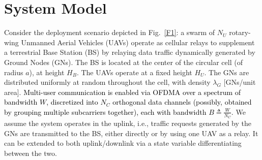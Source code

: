 \documentclass[10pt, twocolumn]{IEEEtran}
\theoremstyle{plain}
\theoremstyle{definition}
\theoremstyle{remark}
\newcommand\hlt[1]{\textcolor{black}{#1}}
\begin{document}
\section{System Model}\label{S2}
Consider the deployment scenario depicted in Fig.~\ref{F1}: a swarm of $N_{U}$ rotary-wing Unmanned Aerial Vehicles (UAVs) operate as cellular relays to supplement a terrestrial Base Station (BS) by relaying data traffic dynamically generated by Ground Nodes (GNs). The BS is located at the center of the circular cell (of radius $a$), at height $H_{B}$. The UAVs operate at a fixed height $H_{U}$. The GNs are distributed uniformly at random throughout the cell, with density $\lambda_{G}$ [GNs/unit area]. \hlt{Multi-user communication is enabled via OFDMA over a spectrum of bandwidth $W$, discretized into $N_{C}$ orthogonal data channels (possibly, obtained by grouping multiple subcarriers together), each with bandwidth $B{\triangleq}\frac{W}{N_{C}}$.} We assume the system operates in the uplink, i.e., traffic requests generated by the GNs are transmitted to the BS, either directly or by using one UAV as a relay. It can be extended to both uplink/downlink via a state variable differentiating between the two.
\end{document}
